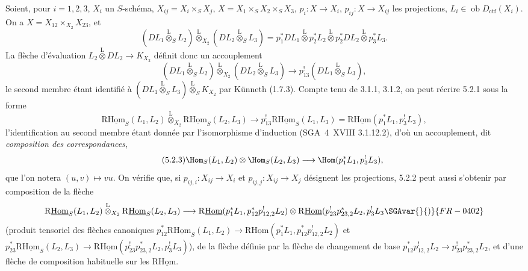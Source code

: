 Soient, pour $i=1,2,3$, $X_i$ un $S$-schéma, $X_{ij}=X_i\times_SX_j$, $X=X_1\times_SX_2\times_SX_3$, $p_i:X\to X_i$, $p_{ij}:X\to X_{ij}$ les projections, $L_i\in\operatorname{ob}D_{\mathrm{ctf}}(X_i)$. On a $X=X_{12}\times_{X_2}X_{23}$, et
\[
(DL_1\overset{\mathrm{L}}{\otimes}_SL_2)\overset{\mathrm{L}}{\otimes}_{X_2}(DL_2\overset{\mathrm{L}}{\otimes}_SL_3)
=p_1^*DL_1\overset{\mathrm{L}}{\otimes}p_2^*L_2\overset{\mathrm{L}}{\otimes}p_2^*DL_2\overset{\mathrm{L}}{\otimes}p_3^*L_3.
\]
La flèche d'évaluation $L_2\overset{\mathrm{L}}{\otimes}DL_2\to K_{X_2}$ définit donc un accouplement
\begin{equation}
\tag{5.2.1}
(DL_1\overset{\mathrm{L}}{\otimes}_SL_2)\overset{\mathrm{L}}{\otimes}_{X_2}(DL_2\overset{\mathrm{L}}{\otimes}_SL_3)\longrightarrow p_{13}^!(DL_1\overset{\mathrm{L}}{\otimes}_SL_3),
\end{equation}
le second membre étant identifié à $(DL_1\overset{\mathrm{L}}{\otimes}_SL_3)\overset{\mathrm{L}}{\otimes}_SK_{X_2}$ par Künneth (1.7.3). Compte tenu de 3.1.1, 3.1.2, on peut récrire 5.2.1 sous la forme
\begin{equation}
\tag{5.2.2}
\mathrm{R}\underline{\mathrm{Hom}}_S(L_1,L_2)\overset{\mathrm{L}}{\otimes}_{X_2}\mathrm{R}\underline{\mathrm{Hom}}_S(L_2,L_3)\longrightarrow p_{13}^!\mathrm{R}\underline{\mathrm{Hom}}_S(L_1,L_3)=\mathrm{R}\underline{\mathrm{Hom}}(p_1^*L_1,p_3^!L_3),
\end{equation}
l'identification au second membre étant donnée par l'isomorphisme d'induction (SGA~4~XVIII 3.1.12.2), d'où un accouplement, dit \emph{composition des correspondances},
\begin{equation}
\tag{5.2.3}
\Hom_S(L_1,L_2)\otimes\Hom_S(L_2,L_3)\longrightarrow\Hom(p_1^*L_1,p_3^!L_3),
\end{equation}
que l'on notera $(u,v)\mapsto vu$. On vérifie que, si $p_{ij,i}:X_{ij}\to X_i$ et $p_{ij,j}:X_{ij}\to X_j$ désignent les projections, 5.2.2 peut aussi s'obtenir par composition de la flèche
\[
\mathrm{R}\underline{\mathrm{Hom}}_S(L_1,L_2)\overset{\mathrm{L}}{\otimes}_{X_2}\mathrm{R}\underline{\mathrm{Hom}}_S(L_2,L_3)
\longrightarrow
\mathrm{R}\underline{\mathrm{Hom}}(p_1^*L_1,p_{12}^*p_{12,2}^!L_2)
\otimes
\mathrm{R}\underline{\mathrm{Hom}}(p_{23}^!p_{23,2}^*L_2,p_3^!L_3\SGAvar{}{)}{FR-0402}
\]
(produit tensoriel des flèches canoniques $p_{12}^*\mathrm{R}\underline{\mathrm{Hom}}_S(L_1,L_2)\to\mathrm{R}\underline{\mathrm{Hom}}(p_1^*L_1,p_{12}^*p_{12,2}^!L_2)$ et $p_{23}^*\mathrm{R}\underline{\mathrm{Hom}}_S(L_2,L_3)\to\mathrm{R}\underline{\mathrm{Hom}}(p_{23}^!p_{23,2}^*L_2,p_3^!L_3)$), de la flèche définie par la flèche de changement de base $p_{12}^*p_{12,2}^!L_2\to p_{23}^!p_{23,2}^*L_2$, et d'une flèche de composition habituelle sur les $\mathrm{R}\underline{\mathrm{Hom}}$.

